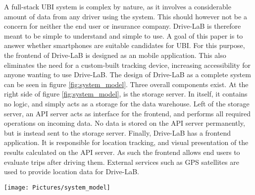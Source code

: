 A full-stack UBI system is complex by nature, as it involves a considerable amount of data from any driver using the system. This should however not be a concern for neither the end user or insurance company. Drive-LaB is therefore meant to be simple to understand and simple to use.
A goal of this paper is to answer whether smartphones are suitable candidates for UBI. For this purpose, the frontend of Drive-LaB is designed as an mobile application. This also eliminates the need for a custom-built tracking device, increasing accessibility for anyone wanting to use Drive-LaB.
The design of Drive-LaB as a complete system can be seen in figure \ref{fig:system_model}. Three overall components exist. At the right side of figure \ref{fig:system_model}, is the storage server. In itself, it contains no logic, and simply acts as a storage for the data warehouse. Left of the storage server, an API server acts as interface for the frontend, and performs all required operations on incoming data. No data is stored on the API server permanently, but is instead sent to the storage server. Finally, Drive-LaB has a frontend application. It is responsible for location tracking, and visual presentation of the results calculated on the API server. As such the frontend allows end users to evaluate trips after driving them. External services such as GPS satellites are used to provide location data for Drive-LaB.

\begin{figure*}[tb]
\centering
\texttt{[image: Pictures/system\_model]}
\caption{Composition of the system}
\label{fig:system_model}
\end{figure*}